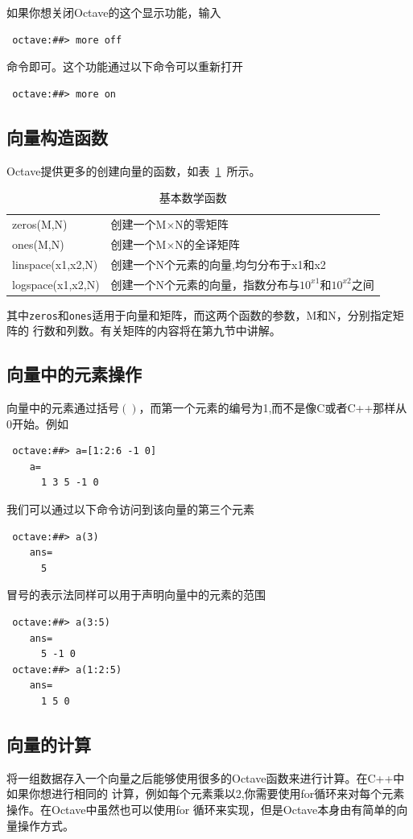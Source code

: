 \documentclass[UTF8,adobefonts]{ctexart}
\begin{document}
如果你想关闭Octave的这个显示功能，输入
\begin{verbatim}
 octave:##> more off
\end{verbatim}
命令即可。这个功能通过以下命令可以重新打开
\begin{verbatim}
 octave:##> more on
\end{verbatim}
\subsection{向量构造函数}
Octave提供更多的创建向量的函数，如表~\ref{tb:vectorfun}~所示。
\begin{table}[htbp]
\caption{基本数学函数}
\label{tb:vectorfun}
\centering
\begin{tabular}{|p{100pt}p{200pt}|}
\hline
zeros(M,N)	& 创建一个M$\times$N的零矩阵\\
ones(M,N)	& 创建一个M$\times$N的全译矩阵\\
linspace(x1,x2,N)	& 创建一个N个元素的向量,均匀分布于x1和x2\\
logspace(x1,x2,N)	& 创建一个N个元素的向量，指数分布与$10^{x1}$和$10^{x2}$之间\\
\hline
\end{tabular}
\end{table}

其中{\tt zeros}和{\tt ones}适用于向量和矩阵，而这两个函数的参数，M和N，分别指定矩阵的
行数和列数。有关矩阵的内容将在第九节中讲解。
\subsection{向量中的元素操作}
向量中的元素通过括号$()$，而第一个元素的编号为1,而不是像C或者C++那样从0开始。例如
\begin{verbatim}
 octave:##> a=[1:2:6 -1 0]
    a=
      1 3 5 -1 0
\end{verbatim}
我们可以通过以下命令访问到该向量的第三个元素
\begin{verbatim}
 octave:##> a(3)
    ans=
      5
\end{verbatim}
冒号的表示法同样可以用于声明向量中的元素的范围
\begin{verbatim}
 octave:##> a(3:5)
    ans=
      5 -1 0
 octave:##> a(1:2:5)
    ans=
      1 5 0
\end{verbatim}
\subsection{向量的计算}
将一组数据存入一个向量之后能够使用很多的Octave函数来进行计算。在C++中如果你想进行相同的
计算，例如每个元素乘以2,你需要使用for循环来对每个元素操作。在Octave中虽然也可以使用for
循环来实现，但是Octave本身由有简单的向量操作方式。
\end{document}
